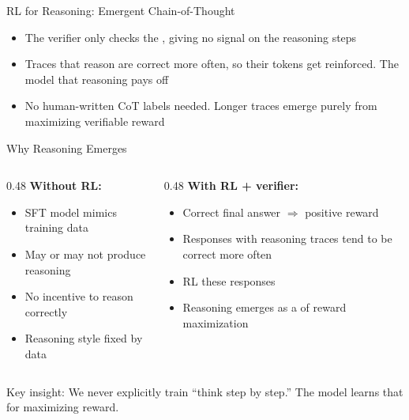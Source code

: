 \begin{frame}{RL for Reasoning: Emergent Chain-of-Thought}
  \vspace{-0.2em}
  \begin{itemize}[nosep]
    \item The verifier only checks the , giving no signal on the reasoning steps
    \item Traces that reason are correct more often, so their tokens get reinforced. The model  that reasoning pays off
    \item No human-written CoT labels needed. Longer traces emerge purely from maximizing verifiable reward
  \end{itemize}
\end{frame}

\begin{frame}{Why Reasoning Emerges}
  \begin{columns}
    \begin{column}{0.48\textwidth}
      \textbf{Without RL:}
      \begin{itemize}
        \item SFT model mimics training data
        \item May or may not produce reasoning
        \item No incentive to reason correctly
        \item Reasoning style fixed by data
      \end{itemize}
    \end{column}
    \begin{column}{0.48\textwidth}
      \textbf{With RL + verifier:}
      \begin{itemize}
        \item Correct final answer $\Rightarrow$ positive reward
        \item Responses with reasoning traces tend to be correct more often
        \item RL  these responses
        \item Reasoning emerges as a  of reward maximization
      \end{itemize}
    \end{column}
  \end{columns}

  \vspace{0.8em}
  Key insight: We never explicitly train ``think step by step.'' The model learns that  for maximizing reward.

  \vspace{0.3em}
\end{frame}

